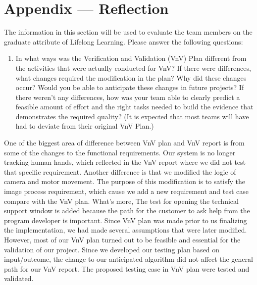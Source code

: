 \documentclass[12pt, titlepage]{article}
\begin{document}



\newpage{}
\section*{Appendix --- Reflection}

The information in this section will be used to evaluate the team members on the
graduate attribute of Lifelong Learning.  Please answer the following questions:


\begin{enumerate}
  \item In what ways was the Verification and Validation (VnV) Plan different
  from the activities that were actually conducted for VnV?  If there were
  differences, what changes required the modification in the plan?  Why did
  these changes occur?  Would you be able to anticipate these changes in future
  projects?  If there weren't any differences, how was your team able to clearly
  predict a feasible amount of effort and the right tasks needed to build the
  evidence that demonstrates the required quality?  (It is expected that most
  teams will have had to deviate from their original VnV Plan.)
  
  
\end{enumerate}
 One of the biggest area of difference between VnV plan and VnV report is from some of the changes to the functional requirements. Our system is no longer tracking human hands, which reflected in the VnV report where we did not test that specific requirement. Another difference is that we modified the logic of camera and motor movement. The purpose of this modification is to satisfy the image process requirement, which cause we add a new requirement and test case compare with the VnV plan. What's more, The test for opening the technical support window is added because the path for the customer to ask help from the program developer is important. Since VnV plan was made prior to us finalizing the implementation, we had made several assumptions that were later modified. However, most of our VnV plan turned out to be feasible and essential for the validation of our project. Since we developed our testing plan based on input/outcome, the change to our anticipated algorithm did not affect the general path for our VnV report. The proposed testing case in VnV plan were tested and validated.
 
 
\end{document}
